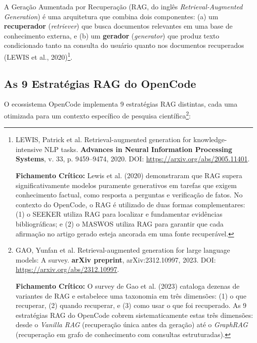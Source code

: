 A Geração Aumentada por Recuperação (RAG, do inglês \textit{Retrieval-Augmented Generation}) é uma arquitetura que combina dois componentes: (a) um \textbf{recuperador} (\textit{retriever}) que busca documentos relevantes em uma base de conhecimento externa, e (b) um \textbf{gerador} (\textit{generator}) que produz texto condicionado tanto na consulta do usuário quanto nos documentos recuperados (LEWIS et al., 2020)\footnote{
  LEWIS, Patrick et al. Retrieval-augmented generation for knowledge-intensive NLP tasks. \textbf{Advances in Neural Information Processing Systems}, v. 33, p. 9459--9474, 2020. DOI: \url{https://arxiv.org/abs/2005.11401}.

  \textbf{Fichamento Crítico:} Lewis et al. (2020) demonstraram que RAG supera significativamente modelos puramente generativos em tarefas que exigem conhecimento factual, como resposta a perguntas e verificação de fatos. No contexto do OpenCode, o RAG é utilizado de duas formas complementares: (1) o SEEKER utiliza RAG para localizar e fundamentar evidências bibliográficas; e (2) o MASWOS utiliza RAG para garantir que cada afirmação no artigo gerado esteja ancorada em uma fonte recuperável.
}.

\subsection{As 9 Estratégias RAG do OpenCode}

O ecossistema OpenCode implementa 9 estratégias RAG distintas, cada uma otimizada para um contexto específico de pesquisa científica\footnote{
  GAO, Yunfan et al. Retrieval-augmented generation for large language models: A survey. \textbf{arXiv preprint}, arXiv:2312.10997, 2023. DOI: \url{https://arxiv.org/abs/2312.10997}.

  \textbf{Fichamento Crítico:} O survey de Gao et al. (2023) cataloga dezenas de variantes de RAG e estabelece uma taxonomia em três dimensões: (1) o que recuperar, (2) quando recuperar, e (3) como usar o que foi recuperado. As 9 estratégias RAG do OpenCode cobrem sistematicamente estas três dimensões: desde o \textit{Vanilla RAG} (recuperação única antes da geração) até o \textit{GraphRAG} (recuperação em grafo de conhecimento com consultas estruturadas).
}:


